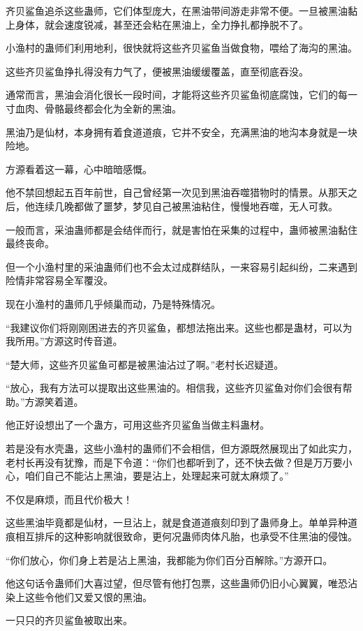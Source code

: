 \begin{this_body}
齐贝鲨鱼追杀这些蛊师，它们体型庞大，在黑油带间游走非常不便。一旦被黑油黏上身体，就会速度锐减，甚至还会粘在黑油上，全力挣扎都挣脱不了。

小渔村的蛊师们利用地利，很快就将这些齐贝鲨鱼当做食物，喂给了海沟的黑油。

这些齐贝鲨鱼挣扎得没有力气了，便被黑油缓缓覆盖，直至彻底吞没。

通常而言，黑油会消化很长一段时间，才能将这些齐贝鲨鱼彻底腐蚀，它们的每一寸血肉、骨骼最终都会化为全新的黑油。

黑油乃是仙材，本身拥有着食道道痕，它并不安全，充满黑油的地沟本身就是一块险地。

方源看着这一幕，心中暗暗感慨。

他不禁回想起五百年前世，自己曾经第一次见到黑油吞噬猎物时的情景。从那天之后，他连续几晚都做了噩梦，梦见自己被黑油粘住，慢慢地吞噬，无人可救。

一般而言，采油蛊师都是会结伴而行，就是害怕在采集的过程中，蛊师被黑油黏住最终丧命。

但一个小渔村里的采油蛊师们也不会太过成群结队，一来容易引起纠纷，二来遇到险情非常容易全军覆没。

现在小渔村的蛊师几乎倾巢而动，乃是特殊情况。

“我建议你们将刚刚困进去的齐贝鲨鱼，都想法拖出来。这些也都是蛊材，可以为我所用。”方源这时传音道。

“楚大师，这些齐贝鲨鱼可都是被黑油沾过了啊。”老村长迟疑道。

“放心，我有方法可以提取出这些黑油的。相信我，这些齐贝鲨鱼对你们会很有帮助。”方源笑着道。

他正好设想出了一个蛊方，可用这些齐贝鲨鱼当做主料蛊材。

若是没有水壳蛊，这些小渔村的蛊师们不会相信，但方源既然展现出了如此实力，老村长再没有犹豫，而是下令道：“你们也都听到了，还不快去做？但是万万要小心，咱们自己不能沾上黑油，要是沾上，处理起来可就太麻烦了。”

不仅是麻烦，而且代价极大！

这些黑油毕竟都是仙材，一旦沾上，就是食道道痕刻印到了蛊师身上。单单异种道痕相互排斥的这种影响就很致命，更何况蛊师肉体凡胎，也承受不住黑油的侵蚀。

“你们放心，你们身上若是沾上黑油，我都能为你们百分百解除。”方源开口。

他这句话令蛊师们大喜过望，但尽管有他打包票，这些蛊师仍旧小心翼翼，唯恐沾染上这些令他们又爱又恨的黑油。

一只只的齐贝鲨鱼被取出来。


\end{this_body}
